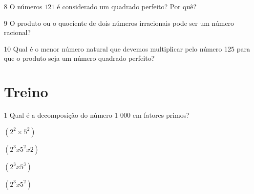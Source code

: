 
\num{8} O números $121$ é considerado um quadrado perfeito? Por quê?


\num{9} O produto ou o quociente de dois números irracionais pode ser um
número racional?





\num{10} Qual é o menor número natural que devemos multiplicar pelo número
125 para que o produto seja um número quadrado perfeito?




\section{Treino}

\num{1} Qual é a decomposição do número 1 000 em fatores primos?

\begin{escolha}
\item $(2^2\times 5^2)$
\item $(2^3 x 5^2 x 2)$
\item $(2^3 x 5^3)$
\item $(2^3x5^2)$
\end{escolha}

